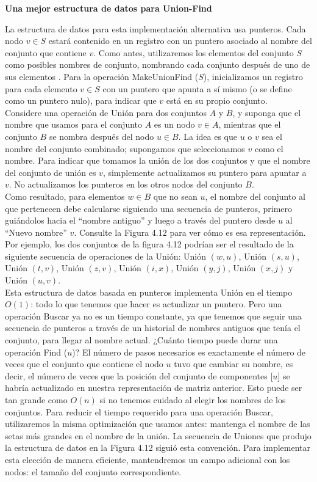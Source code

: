 \documentclass[a4paper, 12pt]{book}
\theoremstyle{dotless}
\begin{document}
\textbf{Una mejor estructura de datos para Union-Find}

La estructura de datos para esta implementación alternativa usa punteros. Cada nodo $v \in S$ estará contenido en un registro con un puntero asociado al nombre del conjunto que contiene $v$. Como antes, utilizaremos los elementos del conjunto $S$ como posibles nombres de conjunto, nombrando cada conjunto después de uno de sus elementos . Para la operación MakeUnionFind ($S$), inicializamos un registro para cada elemento $v \in S$ con un puntero que apunta a sí mismo (o se define como un puntero nulo), para indicar que $v$ está en su propio conjunto.\\

Considere una operación de Unión para dos conjuntos $A$ y $B$, y suponga que el nombre que usamos para el conjunto $A$ es un nodo $v \in A$, mientras que el conjunto $B$ se nombra después del nodo $u \in B$. La idea es que $u$ o $v$ sea el nombre del conjunto combinado; supongamos que seleccionamos $v$ como el nombre. Para indicar que tomamos la unión de los dos conjuntos y que el nombre del conjunto de unión es $v$, simplemente actualizamos su puntero para apuntar a $v$. No actualizamos los punteros en los otros nodos del conjunto $B$.\\

Como resultado, para elementos $w \in B$ que no sean $u$, el nombre del conjunto al que pertenecen debe calcularse siguiendo una secuencia de punteros, primero guiándolos hacia el ``nombre antiguo'' y luego a través del puntero desde $u$ al ``Nuevo nombre'' $v$. Consulte la Figura 4.12 para ver cómo es esa representación. Por ejemplo, los dos conjuntos de la figura 4.12 podrían ser el resultado de la siguiente secuencia de operaciones de la Unión: Unión $(w, u)$, Unión $(s, u)$, Unión $(t, v)$, Unión $(z, v)$, Unión $(i, x)$, Unión $(y, j)$, Unión $(x, j)$ y Unión $(u, v)$.\\

Esta estructura de datos basada en punteros implementa Unión en el tiempo $O(1)$: todo lo que tenemos que hacer es actualizar un puntero. Pero una operación Buscar ya no es un tiempo constante, ya que tenemos que seguir una secuencia de punteros a través de un historial de nombres antiguos que tenía el conjunto, para llegar al nombre actual. ¿Cuánto tiempo puede durar una operación Find ($u$)? El número de pasos necesarios es exactamente el número de veces que el conjunto que contiene el nodo $u$ tuvo que cambiar su nombre, es decir, el número de veces que la posición del conjunto de componentes [$u$] se habría actualizado en nuestra representación de matriz anterior. Esto puede ser tan grande como $O(n)$ si no tenemos cuidado al elegir los nombres de los conjuntos. Para reducir el tiempo requerido para una operación Buscar, utilizaremos la misma optimización que usamos antes: mantenga el nombre de las setas más grandes en el nombre de la unión. La secuencia de Uniones que produjo la estructura de datos en la Figura 4.12 siguió esta convención. Para implementar esta elección de manera eficiente, mantendremos un campo adicional con los nodos: el tamaño del conjunto correspondiente.\\
\end{document}
